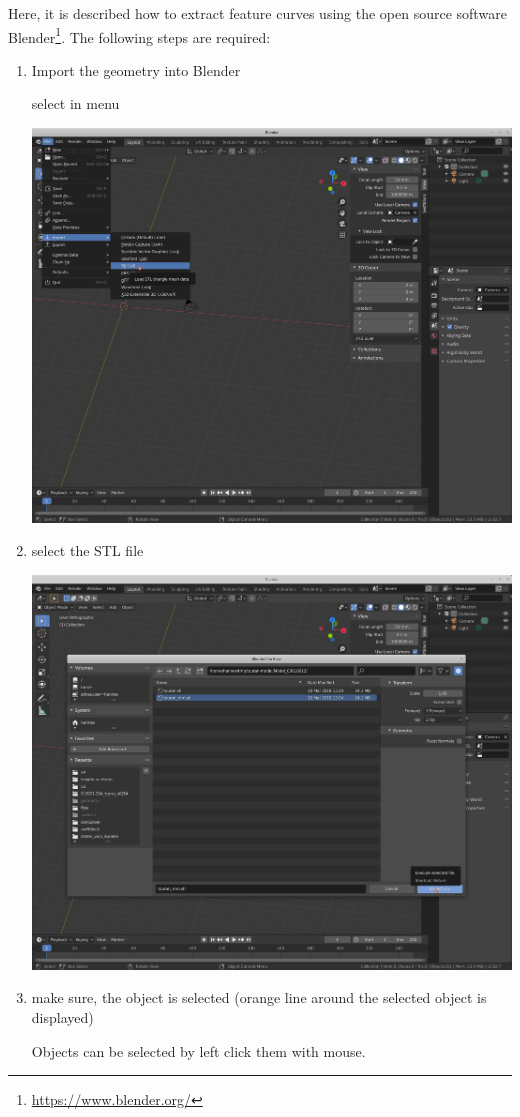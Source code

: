 Here, it is described how to extract feature curves using the open source software Blender\footnote{\url{https://www.blender.org/}}.
The following steps are required:
\begin{enumerate}
\item Import the geometry into Blender

select in menu 

\includegraphics[width=0.75\linewidth]{figs/feature_edges_blender/01_import_stl_1}

\item select the STL file

\includegraphics[width=0.75\linewidth]{figs/feature_edges_blender/02_import_stl_2}

\item make sure, the object is selected (orange line around the selected object is displayed)

Objects can be selected by left click them with mouse.


\end{enumerate}
